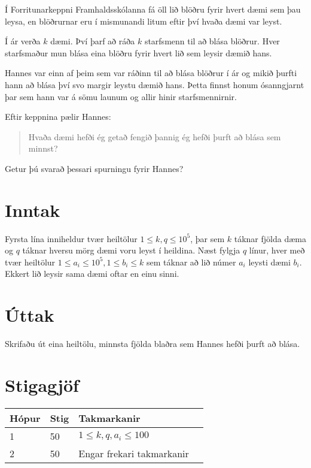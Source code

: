 
\noindent
Í Forritunarkeppni Framhaldsskólanna fá öll lið blöðru fyrir hvert dæmi sem þau
leysa, en blöðrurnar eru í mismunandi litum eftir því hvaða dæmi var leyst.

Í ár verða $k$ dæmi. Því þarf að ráða $k$ starfsmenn til að blása blöðrur.
Hver starfsmaður mun blása eina blöðru fyrir hvert lið sem leysir dæmið hans.

Hannes var einn af þeim sem var ráðinn til að blása blöðrur í ár og mikið þurfti hann að blása
því svo margir leystu dæmið hans. Þetta finnst honum ósanngjarnt þar sem hann var á sömu launum
og allir hinir starfsmennirnir.

Eftir keppnina pælir Hannes:
\begin{quote}
    Hvaða dæmi hefði ég getað fengið þannig ég hefði þurft að blása sem minnst?
\end{quote}

Getur þú svarað þessari spurningu fyrir Hannes?

\section*{Inntak}
Fyrsta lína inniheldur tvær heiltölur $1 \le k,q \le 10^5$, þar sem
$k$ táknar fjölda dæma og $q$ táknar hversu mörg dæmi voru leyst í heildina.
Næst fylgja $q$ línur, hver með tvær heiltölur $1 \le a_i \le 10^5, 1 \le b_i \le k$ sem táknar að lið númer $a_i$ leysti dæmi $b_i$.
Ekkert lið leysir sama dæmi oftar en einu sinni.

\section*{Úttak}
Skrifaðu út eina heiltölu, minnsta fjölda blaðra sem Hannes hefði þurft að blása.

\section*{Stigagjöf}
\begin{tabular}{|l|l|l|l|}
\hline
Hópur & Stig & Takmarkanir \\ \hline
1     & 50  & $1 \le k,q,a_i \le 100$ \\ \hline
2     & 50  & Engar frekari takmarkanir \\ \hline
\end{tabular}

